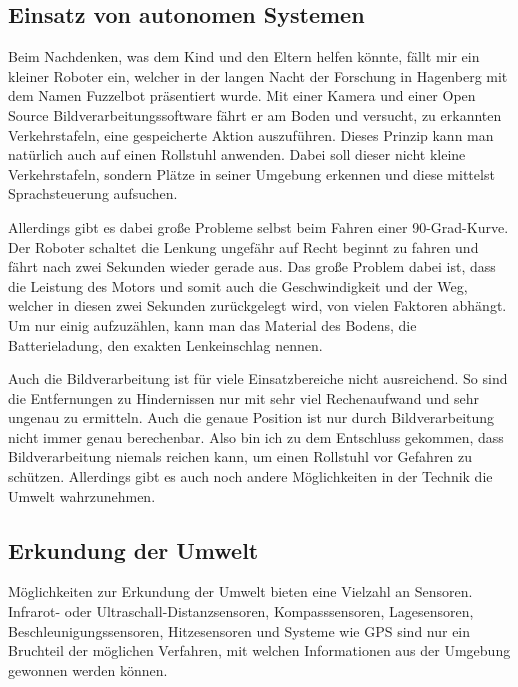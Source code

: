 \subsection{Einsatz von autonomen Systemen}
Beim Nachdenken, was dem Kind und den Eltern helfen könnte, fällt mir ein kleiner Roboter ein, welcher in der langen Nacht der Forschung in Hagenberg mit dem Namen Fuzzelbot präsentiert wurde.
Mit einer Kamera und einer Open Source Bildverarbeitungssoftware fährt er am Boden und versucht, zu erkannten Verkehrstafeln, eine gespeicherte Aktion auszuführen.
Dieses Prinzip kann man natürlich auch auf einen Rollstuhl anwenden.
Dabei soll dieser nicht kleine Verkehrstafeln, sondern Plätze in seiner Umgebung erkennen und diese mittelst Sprachsteuerung aufsuchen.

Allerdings gibt es dabei große Probleme selbst beim Fahren einer 90-Grad-Kurve.
Der Roboter schaltet die Lenkung ungefähr auf Recht beginnt zu fahren und fährt nach zwei Sekunden wieder gerade aus.
Das große Problem dabei ist, dass die Leistung des Motors und somit auch die Geschwindigkeit und der Weg, welcher in diesen zwei Sekunden zurückgelegt wird, von vielen Faktoren abhängt.
Um nur einig aufzuzählen, kann man das Material des Bodens, die Batterieladung, den exakten Lenkeinschlag nennen.

Auch die Bildverarbeitung ist für viele Einsatzbereiche nicht ausreichend.
So sind die Entfernungen zu Hindernissen nur mit sehr viel Rechenaufwand und sehr ungenau zu ermitteln.
Auch die genaue Position ist nur durch Bildverarbeitung nicht immer genau berechenbar.
Also bin ich zu dem Entschluss gekommen, dass Bildverarbeitung niemals reichen kann, um einen Rollstuhl vor Gefahren zu schützen.
Allerdings gibt es auch noch andere Möglichkeiten in der Technik die Umwelt wahrzunehmen.


\subsection{Erkundung der Umwelt}
Möglichkeiten zur Erkundung der Umwelt bieten eine Vielzahl an Sensoren.
Infrarot- oder Ultraschall-Distanzsensoren, Kompasssensoren, Lagesensoren, Beschleunigungssensoren, Hitzesensoren und Systeme wie GPS sind nur ein Bruchteil der möglichen Verfahren, mit welchen Informationen aus der Umgebung gewonnen werden können.


